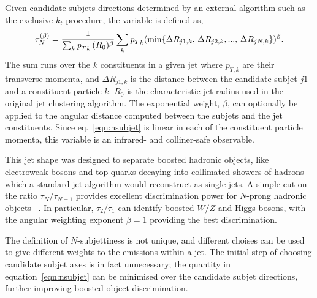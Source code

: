 Given candidate subjets directions determined by an external algorithm such as the exclusive $k_t$ procedure, the variable is defined as,
%
\begin{equation} 
\tau^{(\beta)}_N = \frac{1}{\sum_k {{\emph{p}_{T}}}_k\,(R_0)^{\beta}} \sum_k {{\emph{p}_{T}}}_k (\min \{ \Delta R_{j1,k},\,\Delta R_{j2,k},...,\,\Delta R_{jN,k} \})^{\beta}.
\label{eqn:nsubjet}
\end{equation} 
%
The sum runs over the $k$ constituents in a given jet where $p_{T,k}$ are their transverse momenta, and $\Delta R_{j1,k}$ is the distance between the candidate subjet $j1$ and a constituent particle $k$.  $R_0$ is the characteristic jet radius used in the original jet clustering algorithm.  The exponential weight, $\beta$, can optionally be applied to the angular distance computed between the subjets and the jet constituents.   
Since eq.~\ref{eqn:nsubjet} is linear in each of the constituent particle momenta, this variable is an infrared- and colliner-safe observable.


This jet shape was designed to separate boosted hadronic objects, like electroweak bosons and top quarks decaying into collimated showers of hadrons which a standard jet algorithm would reconstruct as single jets. %
A simple cut on the ratio $\tau_N/\tau_{N-1}$ provides excellent discrimination power for $N$-prong hadronic objects~\cite{nsubjettiness} . In particular, $\tau_2/\tau_1$ can identify boosted $W/Z$ and Higgs bosons, with the angular weighting exponent $\beta =1$ providing the best discrimination.

The definition of $N$-subjettiness is not unique, and different choises can be used to give different weights to the emissions within a jet. The initial step of choosing candidate subjet axes is in fact unnecessary; the quantity in equation~\ref{eqn:nsubjet} can be minimised over the candidate subjet directions, further improving boosted object discrimination.

